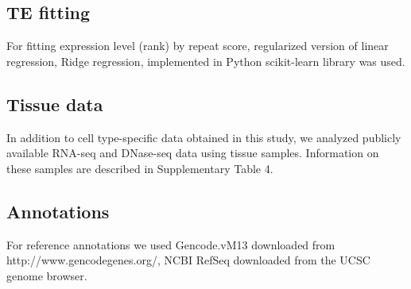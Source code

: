 \subsection{TE fitting}
For fitting expression level (rank) by repeat score, regularized version of linear regression, Ridge regression, implemented in Python scikit-learn library \citep{scikit-learn} was used.

\subsection{Tissue data}
In addition to cell type-specific data obtained in this study, we analyzed publicly available RNA-seq and DNase-seq data using tissue samples. Information on these samples are described in Supplementary Table 4.

\subsection{Annotations}
For reference annotations we used Gencode.vM13 \citep{Harrow_2012} downloaded from http://www.gencodegenes.org/, NCBI RefSeq \citep{Pruitt_2013} downloaded from the UCSC genome browser.


